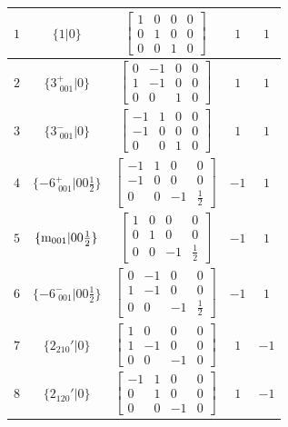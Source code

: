 \documentclass[fleqn,8pt]{jsarticle}
\begin{document}
\begin{longtable}{ccccc}
$ 1 $ & $ \{1|0\} $ & $ \begin{bmatrix} 1 & 0 & 0 & 0 \\ 0 & 1 & 0 & 0 \\ 0 & 0 & 1 & 0 \end{bmatrix} $ & $ 1 $ & $ 1 $ \\ \hline
$ 2 $ & $ \{3^{+}_{\,\,001}|0\} $ & $ \begin{bmatrix} 0 & -1 & 0 & 0 \\ 1 & -1 & 0 & 0 \\ 0 & 0 & 1 & 0 \end{bmatrix} $ & $ 1 $ & $ 1 $ \\ \hline
$ 3 $ & $ \{3^{-}_{\,\,001}|0\} $ & $ \begin{bmatrix} -1 & 1 & 0 & 0 \\ -1 & 0 & 0 & 0 \\ 0 & 0 & 1 & 0 \end{bmatrix} $ & $ 1 $ & $ 1 $ \\ \hline
$ 4 $ & $ \{-6^{+}_{\,\,001}|0 0 \frac{1}{2}\} $ & $ \begin{bmatrix} -1 & 1 & 0 & 0 \\ -1 & 0 & 0 & 0 \\ 0 & 0 & -1 & \frac{1}{2} \end{bmatrix} $ & $ -1 $ & $ 1 $ \\ \hline
$ 5 $ & $ \{{\rm m}_{001}|0 0 \frac{1}{2}\} $ & $ \begin{bmatrix} 1 & 0 & 0 & 0 \\ 0 & 1 & 0 & 0 \\ 0 & 0 & -1 & \frac{1}{2} \end{bmatrix} $ & $ -1 $ & $ 1 $ \\ \hline
$ 6 $ & $ \{-6^{-}_{\,\,001}|0 0 \frac{1}{2}\} $ & $ \begin{bmatrix} 0 & -1 & 0 & 0 \\ 1 & -1 & 0 & 0 \\ 0 & 0 & -1 & \frac{1}{2} \end{bmatrix} $ & $ -1 $ & $ 1 $ \\ \hline
$ 7 $ & $ \{2{}_{210}{}'|0\} $ & $ \begin{bmatrix} 1 & 0 & 0 & 0 \\ 1 & -1 & 0 & 0 \\ 0 & 0 & -1 & 0 \end{bmatrix} $ & $ 1 $ & $ -1 $ \\ \hline
$ 8 $ & $ \{2{}_{120}{}'|0\} $ & $ \begin{bmatrix} -1 & 1 & 0 & 0 \\ 0 & 1 & 0 & 0 \\ 0 & 0 & -1 & 0 \end{bmatrix} $ & $ 1 $ & $ -1 $ \\ \hline

\end{longtable}
\end{document}
